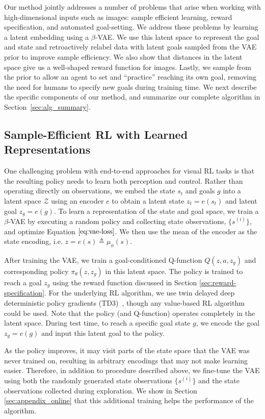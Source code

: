 \documentclass{article}
\begin{document}
Our method jointly addresses a number of problems that arise when working with high-dimensional inputs such as images:
sample efficient learning, reward specification, and automated goal-setting.
We address these problems by learning a latent embedding using a $\beta$-VAE.
We use this latent space to represent the goal and state and retroactively relabel data with latent goals sampled from the VAE prior to improve sample efficiency.
We also show that distances in the latent space give us a well-shaped reward function for images.
Lastly, we sample from the prior to allow an agent to set and ``practice'' reaching its own goal, removing the need for humans to specify new goals during training time.
We next describe the specific components of our method, and summarize our complete algorithm in Section~\ref{sec:alg_summary}.

\subsection{Sample-Efficient RL with Learned Representations}
One challenging problem with end-to-end approaches for visual RL tasks is that the resulting policy needs to learn both perception and control.
Rather than operating directly on observations, we embed the state $s_t$ and goals $g$ into a latent space $\mathcal Z$ using an encoder $e$ to obtain a latent state $z_t = e(s_t)$ and latent goal $z_g = e(g)$.
To learn a representation of the state and goal space, we train a $\beta$-VAE by executing a random policy and collecting state observations, $\{s^{(i)}\}$, and optimize Equation $\eqref{eq:vae-loss}$.
We then use the mean of the encoder as the state encoding, i.e. $z = e(s) \triangleq \mu_\phi(s)$.

After training the VAE, we train a goal-conditioned Q-function $Q(z, a, z_g)$ and corresponding policy $\pi_\theta(z, z_g)$ in this latent space.
The policy is trained to reach a goal $z_g$ using the reward function discussed in Section \ref{sec:reward-specification}.
For the underlying RL algorithm, we use twin delayed deep deterministic policy gradients (TD3)~\citep{fujimoto2018td3}, though any value-based RL algorithm could be used.
Note that the policy (and Q-function) operates completely in the latent space.
During test time, to reach a specific goal state $g$, we encode the goal $z_g = e(g)$ and input this latent goal to the policy.

As the policy improves, it may visit parts of the state space that the VAE was never trained on, resulting in arbitrary encodings that may not make learning easier.
Therefore, in addition to procedure described above, we fine-tune the VAE using both the randomly generated state observations $\{s^{(i)}\}$ and the state observations collected during exploration.
We show in Section \ref{sec:appendix_online} that this additional training helps the performance of the algorithm.
\end{document}
